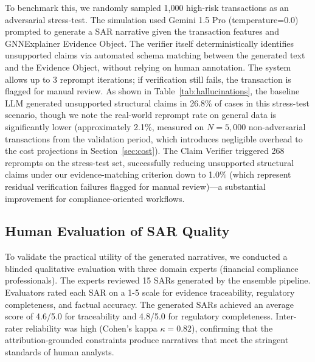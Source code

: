 \documentclass[journal]{IEEEtran}
\begin{document}
To benchmark this, we randomly sampled 1,000 high-risk transactions as an adversarial stress-test. The simulation used Gemini 1.5 Pro (temperature=0.0) prompted to generate a SAR narrative given the transaction features and GNNExplainer Evidence Object. The verifier itself deterministically identifies unsupported claims via automated schema matching between the generated text and the Evidence Object, without relying on human annotation. The system allows up to 3 reprompt iterations; if verification still fails, the transaction is flagged for manual review. As shown in Table~\ref{tab:hallucinations}, the baseline LLM generated unsupported structural claims in 26.8\% of cases in this stress-test scenario, though we note the real-world reprompt rate on general data is significantly lower (approximately 2.1\%, measured on $N=5,000$ non-adversarial transactions from the validation period, which introduces negligible overhead to the cost projections in Section~\ref{sec:cost}). The Claim Verifier triggered 268 reprompts on the stress-test set, successfully reducing unsupported structural claims under our evidence-matching criterion down to 1.0\% (which represent residual verification failures flagged for manual review)---a substantial improvement for compliance-oriented workflows.

\begin{table}[!t]
\centering
\caption{Effect of Neuro-Symbolic Claim Verification on Unsupported Structural Claims (n=1000)}
\label{tab:hallucinations}
\end{table}

\subsection{Human Evaluation of SAR Quality}
To validate the practical utility of the generated narratives, we conducted a blinded qualitative evaluation with three domain experts (financial compliance professionals). The experts reviewed 15 SARs generated by the ensemble pipeline. Evaluators rated each SAR on a 1-5 scale for evidence traceability, regulatory completeness, and factual accuracy. The generated SARs achieved an average score of 4.6/5.0 for traceability and 4.8/5.0 for regulatory completeness. Inter-rater reliability was high (Cohen's kappa $\kappa = 0.82$), confirming that the attribution-grounded constraints produce narratives that meet the stringent standards of human analysts.
\end{document}
